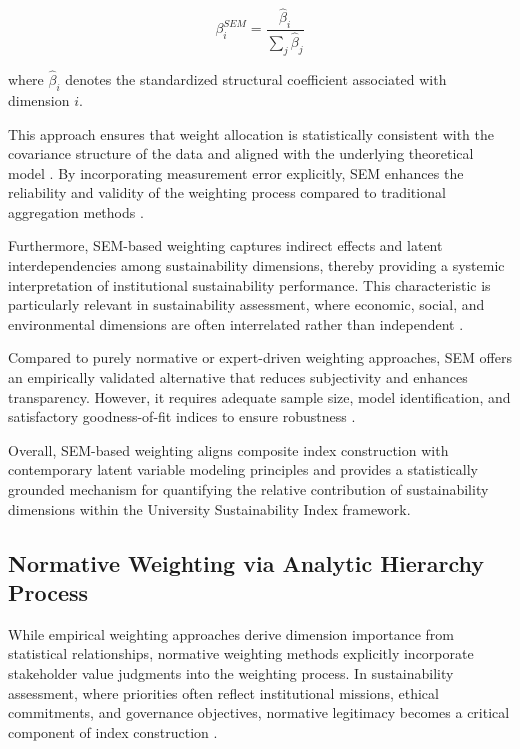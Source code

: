 \documentclass[11pt,a4paper]{article}
\begin{document}
\begin{equation}
\beta_i^{SEM} = \frac{\hat{\beta}_i}{\sum_{j} \hat{\beta}_j}
\end{equation}

where $\hat{\beta}_i$ denotes the standardized structural coefficient associated with dimension $i$.

This approach ensures that weight allocation is statistically consistent with the covariance structure of the data and aligned with the underlying theoretical model \cite{Joreskog1973}. By incorporating measurement error explicitly, SEM enhances the reliability and validity of the weighting process compared to traditional aggregation methods \cite{Hair2022}.

Furthermore, SEM-based weighting captures indirect effects and latent interdependencies among sustainability dimensions, thereby providing a systemic interpretation of institutional sustainability performance. This characteristic is particularly relevant in sustainability assessment, where economic, social, and environmental dimensions are often interrelated rather than independent \cite{Greco2019}.

Compared to purely normative or expert-driven weighting approaches, SEM offers an empirically validated alternative that reduces subjectivity and enhances transparency. However, it requires adequate sample size, model identification, and satisfactory goodness-of-fit indices to ensure robustness \cite{Kline2016,Hair2022}.

Overall, SEM-based weighting aligns composite index construction with contemporary latent variable modeling principles and provides a statistically grounded mechanism for quantifying the relative contribution of sustainability dimensions within the University Sustainability Index framework.
\subsection{Normative Weighting via Analytic Hierarchy Process}

While empirical weighting approaches derive dimension importance from statistical relationships, normative weighting methods explicitly incorporate stakeholder value judgments into the weighting process. In sustainability assessment, where priorities often reflect institutional missions, ethical commitments, and governance objectives, normative legitimacy becomes a critical component of index construction \cite{Saltelli2007,Cinelli2014}.
\end{document}

